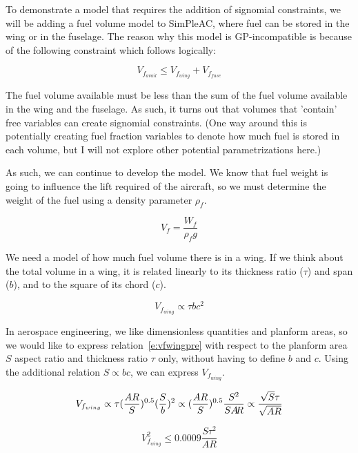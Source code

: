 To demonstrate a model that requires the addition of signomial constraints, we will 
be adding a fuel volume model to SimPleAC, where fuel can be stored in the wing or
in the fuselage. The reason why this model is GP-incompatible is because of the 
following constraint which follows logically:

\begin{equation}
	V_{f_{avail}} \leq V_{f_{wing}} + V_{f_{fuse}}
	\label{vfavail}
\end{equation}

The fuel volume available must be less than the sum of the fuel volume available in the
wing and the fuselage. As such, it turns out that volumes that 'contain' free variables
can create signomial constraints. (One way around this is potentially creating fuel
fraction variables to denote how much fuel is stored in each volume, but I will not 
explore other potential parametrizations here.)

As such, we can continue to develop the model. We know that fuel weight is going 
to influence the lift required of the aircraft, so we must determine the weight of the fuel 
using a density parameter $\rho_{f}$. 

\begin{equation}
    V_f = \frac{W_f } {\rho_f g}
    \label{e:vf}
\end{equation}

We need a model of how much fuel volume there is in a wing. If we think about the total
volume in a wing, it is related linearly to its thickness ratio ($\tau$) and span ($b$), 
and to the square of its chord ($c$). 

\begin{equation}
	V_{f_{wing}} \propto \tau b c^2
	\label{e:vfwingpre}
\end{equation} 

In aerospace engineering, we like dimensionless quantities and planform areas, 
so we would like to express relation~\ref{e:vfwingpre} with respect to the planform area $S$
aspect ratio \AR and thickness ratio $\tau$ only, without having to define $b$ and $c$. 
Using the additional relation $S \propto b c$, we can express $V_{f_{wing}}$. 

\begin{equation}
	V_{f_{wing}} \propto \tau (\frac{AR}{S})^{0.5} (\frac{S}{b})^2 \propto
		(\frac{AR}{S})^{0.5} \frac{S^2}{S A\hspace{-2.0pt}R} \propto \frac{\sqrt{S}\tau}{\sqrt{AR}}
\end{equation}

\begin{equation}
    V_{f_{wing}}^2 \leq 0.0009 \frac{S \tau^2}{AR}
	\label{e:vfwing}
\end{equation}

